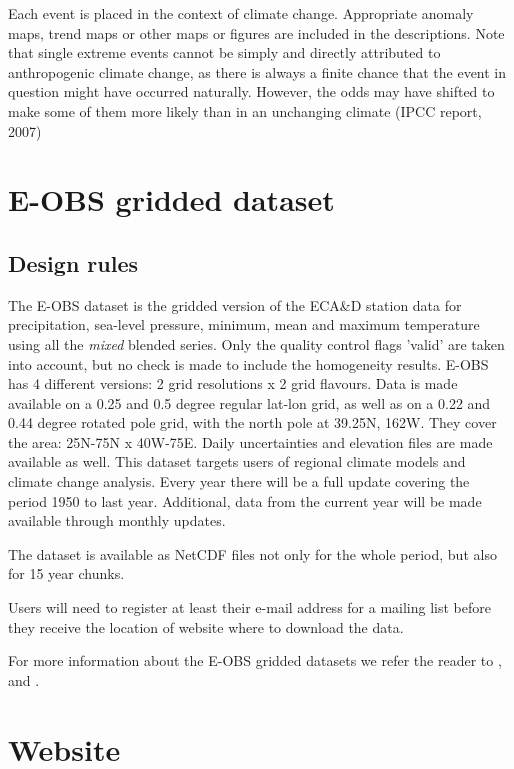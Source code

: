 \documentclass[a4paper,11pt]{article}
\begin{document}
Each event is placed in the context of climate change. Appropriate
anomaly maps, trend maps or other maps or figures are included in the
descriptions. Note that single extreme events cannot be simply and
directly attributed to anthropogenic climate change, as there is
always a finite chance that the event in question might have occurred
naturally. However, the odds may have shifted to make some of them
more likely than in an unchanging climate (IPCC report, 2007)


\section{E-OBS gridded dataset}
\label{sec:eobs}
\subsection{Design rules}
\label{sec:eobsrules}

The E-OBS dataset is the gridded version of the ECA\&D station data
for precipitation, sea-level pressure, minimum, mean and maximum temperature using all the
\emph{mixed} blended series. Only the quality control flags 'valid' are taken into
account, but no check is made to include the homogeneity
results. E-OBS has 4 different versions: 2 grid resolutions x 2 grid
flavours. Data is made available on a 0.25 and 0.5 degree regular
lat-lon grid, as well as on a 0.22 and 0.44 degree rotated pole grid,
with the north pole at 39.25N, 162W. They cover the area: 25N-75N x
40W-75E. Daily uncertainties and elevation files are made available as
well. This dataset targets users of regional climate models and
climate change analysis. Every year there will be a full update
covering the period 1950 to last year. Additional, data from the
current year will be made available through monthly updates.

The dataset is available as NetCDF files not only for the whole
period, but also for 15 year chunks. 

Users will need to register at least their e-mail address for a
mailing list before they receive the location of website where to
download the data.

For more information about the E-OBS gridded datasets we refer the
reader to \citet{haylock}, \citet{hofstra} and \citet{besselaar2011}.


\section{Website}
\label{sec:website}
\end{document}
